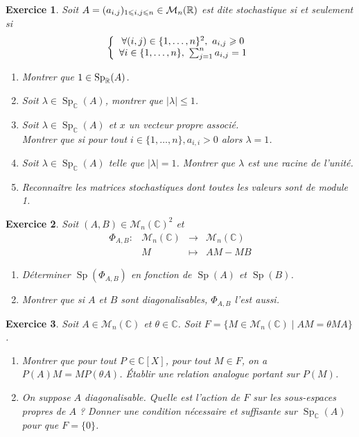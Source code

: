 \documentclass[12pt]{article}
\newtheorem{exercise}{Exercice}[section]
\theoremstyle{remark}
\theoremstyle{remark}
\newcommand{\C}{\mathbb{C}} \newcommand{\Q}{\mathbb{Q}}
\newcommand{\M}{\mathcal{M}} \renewcommand{\L}{\mathcal{L}}
\DeclareMathOperator{\Sp}{Sp} \DeclareMathOperator{\mat}{mat}
\newcommand{\function}[5]{
	$$
	\begin{array}{rccl}
		#1: & #2 & \to & #3 \\
		& #4 & \mapsto & #5
	\end{array}
	$$
}
\begin{document}
\begin{exercise}
	Soit $A=(a_{i,j})_{1\leqslant i,j\leqslant n}\in\M_{n}(\R)$ est dite stochastique si et seulement si
	$$
	\left\{
		\begin{array}[]{c}
			\forall(i,j)\in\{1,\dots,n\}^{2},~a_{i,j}\geqslant0\\
			\forall
			i\in\{1,\dots,n\},~\sum_{j=1}^{n}a_{i,j}=1
		\end{array}
	\right.
	$$
	\begin{enumerate}
		\item Montrer que $1\in\Sp_{\R}(A)$.
		\item Soit $\lambda\in\Sp_{\C}(A)$, montrer que $\vert\lambda\vert\leqslant1$.
		\item Soit $\lambda\in\Sp_{\C}(A)$ et $x$ un vecteur propre associé.\\
		Montrer que si pour tout $i\in\{1,\dots,n\}, a_{i,i}>0$ alors $\lambda=1$.
		\item Soit $\lambda\in\Sp_{\C}(A)$ telle que $\vert \lambda\vert=1$. Montrer que $\lambda$ est une racine de l'unité.
		\item Reconnaître les matrices stochastiques dont toutes les valeurs sont de module 1.
	\end{enumerate}
\end{exercise}

\begin{exercise}
	Soit $(A,B)\in\M_{n}(\C)^{2}$ et \function{\Phi_{A,B}}{\M_n(\C)}{\M_n(\C)}{M}{AM-MB}
	\begin{enumerate}
		\item Déterminer $\Sp(\Phi_{A,B})$ en fonction de $\Sp(A)$ et $\Sp(B)$.
		\item Montrer que si $A$ et $B$ sont diagonalisables, $\Phi_{A,B}$ l'est aussi.
	\end{enumerate}
\end{exercise}

\begin{exercise}
	Soit $A\in\M_{n}(\C)$ et $\theta\in\C$. Soit $F=\{M\in\M_{n}(\C)\mid AM=\theta MA\}$.
	\begin{enumerate}
		\item Montrer que pour tout $P\in\C[X]$, pour tout $M\in F$, on a $P(A)M=MP(\theta A)$. Établir une relation analogue portant sur $P(M)$.
		\item On suppose $A$ diagonalisable. Quelle est l'action de $F$ sur les sous-espaces propres de $A$ ? Donner une condition nécessaire et suffisante sur $\Sp_{\C}(A)$ pour que $F=\{0\}$.
	\end{enumerate}
\end{exercise}
\end{document}

